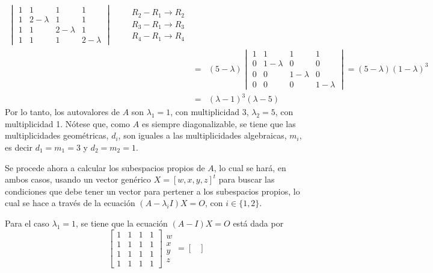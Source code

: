 \begin{solucion}
\begin{eqnarray*}
\begin{vmatrix}
   1 & 1 & 1 & 1 \\
   1 & 2 - \lambda & 1 & 1 \\
   1 & 1 & 2 - \lambda & 1 \\
   1 & 1 & 1 & 2 - \lambda
  \end{vmatrix}
  \qquad 
  \begin{matrix}
   R_2 - R_1 \to R_2 \\
   R_3 - R_1 \to R_3 \\
   R_4 - R_1 \to R_4
  \end{matrix}
  \\
  & = & 
  (5-\lambda)
  \begin{vmatrix}
   1 & 1 & 1 & 1 \\
   0 & 1 - \lambda & 0 & 0 \\
   0 & 0 & 1 - \lambda & 0 \\
   0 & 0 & 0 & 1 - \lambda
  \end{vmatrix} = (5-\lambda)(1-\lambda)^3
  \\
  & = & (\lambda-1)^3(\lambda-5)
 \end{eqnarray*}
 Por lo tanto, los autovalores de $A$ son $\lambda_1 = 1$, con multiplicidad $3$, $\lambda_2 = 5$, con multiplicidad 1. N\'otese que, como $A$ es siempre diagonalizable, se tiene que las multiplicidades geom\'etricas, $d_i$, son iguales a las multiplicidades algebraicas, $m_i$, es decir $d_1 = m_1 = 3$ y $d_2 = m_2 = 1$.
 \par 
 Se procede ahora a calcular los subespacios propios de $A$, lo cual se har\'a, en ambos casos, usando un vector gen\'erico $X = [w,x,y,z]^t$ para buscar las condiciones que debe tener un vector para pertener a los subespacios propios, lo cual se hace a trav\'es de la ecuaci\'on $(A-\lambda_i I)X = O$, con $i\in\{1,2\}$.
 \par 
 Para el caso $\lambda_1 = 1$, se tiene que la ecuaci\'on $(A-I)X = O$ est\'a dada por
 \begin{equation*}
  \begin{bmatrix}
   1 & 1 & 1 & 1 \\
   1 & 1 & 1 & 1 \\
   1 & 1 & 1 & 1 \\
   1 & 1 & 1 & 1
  \end{bmatrix}
  \begin{matrix}
   w \\ x \\ y \\ z 
  \end{matrix}
  =
  \begin{bmatrix}

\end{bmatrix}
\end{equation*}
\end{solucion}
